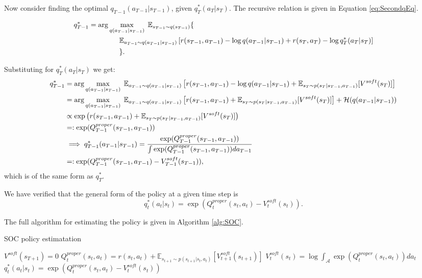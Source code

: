 \documentclass{report}
\numberwithin{equation}{section}
\numberwithin{figure}{section}
\numberwithin{table}{section}
\numberwithin{algorithm}{section}
\begin{document}
Now consider finding the optimal $q_{T-1}(a_{T-1}|s_{T-1})$, 
given $q_T^*(a_T|s_T)$. The recursive relation is given 
in Equation \ref{eq:SecondqEq}.

\begin{align}\label{eq:SecondqEq}
  q_{T-1}^*&=\arg \max_{q(a_{T-1}|s_{T-1})}\; \mathbb{E}_{s_{T-1}\sim q(s_{T-1})}\{\notag\\
    &\qquad\qquad \;\mathbb{E}_{a_{T-1}\sim q(a_{T-1}|s_{T-1})}
    \left[
      r(s_{T-1},a_{T-1}) - \log q(a_{T-1}|s_{T-1})
      + r(s_{T}, a_T) - \log q^*_{T}(a_T|s_T)
    \right]\notag\\
  &\qquad\qquad\;\}.
\end{align}

Substituting for $q^*_T(a_T|s_T)$ we get:
\begin{align*}
  q^*_{T-1}&=\arg \max_{q(a_{T-1}|s_{T-1})}\;
  \mathbb{E}_{a_{T-1}\sim q(a_{T-1}|s_{T-1})}
  \left[
    r(s_{T-1},a_{T-1}) - \log q(a_{T-1}|s_{T-1})
    + \mathbb{E}_{s_T\sim p(s_{T}|s_{T-1},a_{T-1})}[V^{soft}(s_T)]
  \right]\notag\\
  &=\arg \max_{q(a_{T-1}|s_{T-1})}\;
  \mathbb{E}_{a_{T-1}\sim q(a_{T-1}|s_{T-1})}
  \left[
    r(s_{T-1},a_{T-1}) + \mathbb{E}_{s_T\sim p(s_{T}|s_{T-1},a_{T-1})}[V^{soft}(s_T)]
  \right] + \mathcal{H}(q(a_{T-1}|s_{T-1}))\notag\\
  &\propto \exp\left(r(s_{T-1},a_{T-1}) + \mathbb{E}_{s_T\sim p(s_{T}|s_{T-1},a_{T-1})}[V^{soft}(s_T)]\right)\notag\\
  &=:\exp(Q^{proper}_{T-1}(s_{T-1}, a_{T-1}))\notag\\
  &\implies q^*_{T-1}(a_{T-1}|s_{T-1})=\frac{\exp(Q^{proper}_{T-1}(s_{T-1}, a_{T-1}))}{\int \exp(Q^{proper}_{T-1}(s_{T-1}, a_{T-1}))da_{T-1}}\notag\\
  &=:\exp(Q^{proper}_{T-1}(s_{T-1},a_{T-1})-V^{soft}_{T-1}(s_{T-1})),
\end{align*}
which is of the same form as $q^*_T$.

We have verified that the general 
form of the policy at a given time step is 
\begin{equation}\label{eq:generalqForm}
  q^*_t(a_t|s_t)=\exp(Q^{proper}_{t}(s_t,a_t)-V^{soft}_{t}(s_t)). 
\end{equation}

The full algorithm for estimating the policy is given in Algorithm 
\ref{alg:SOC}.

\begin{algorithm}
  \caption{SOC policy estimatation}
  \label{alg:SOC}
  \begin{algorithmic}
    \State $V^{soft}(s_{T+1})=0$
    \State $Q^{proper}_t(s_t, a_t)=r(s_t, a_t) + \mathbb{E}_{s_{t+1}\sim p(s_{t+1}|s_t,a_t)}[V^{soft}_{t+1}(s_{t+1})]$
    \State $V^{soft}_t(s_t)=\log\int_{\mathcal{A}}\exp(Q^{proper}_t(s_t,a_t))da_t$
    \State $q_t^*(a_t|s_t)=\exp(Q^{proper}_t(s_t,a_t)-V^{soft}_t(s_t))$
    \EndFor
  \end{algorithmic}
\end{algorithm}
\end{document}

